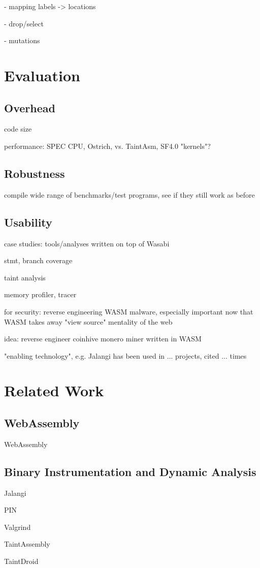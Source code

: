 \documentclass[sigplan,review,anonymous]{acmart}\settopmatter{printfolios=true,printccs=false,printacmref=false}
\newcommand{\name}{Wasabi}
\begin{document}
- mapping labels -> locations

- drop/select

- mutations

\newpage
\section{Evaluation}

\subsection{Overhead}
code size

performance: SPEC CPU, Ostrich, vs. TaintAsm, SF4.0 "kernels"?

\subsection{Robustness}
compile wide range of benchmarks/test programs, see if they still work as before

\subsection{Usability}
case studies: tools/analyses written on top of \name

stmt, branch coverage

taint analysis

memory profiler, tracer

for security: reverse engineering WASM malware, especially important now that WASM takes away "view source" mentality of the web

idea: reverse engineer coinhive monero miner written in WASM

"enabling technology", e.g. Jalangi has been used in ... projects, cited ... times

\newpage
\section{Related Work}

\subsection{WebAssembly}

WebAssembly \cite{Haas:2017:BWU:3062341.3062363}

\subsection{Binary Instrumentation and Dynamic Analysis}

Jalangi \cite{Sen:2013:JSR:2491411.2491447}

PIN \cite{Luk:2005:PBC:1065010.1065034}

Valgrind \cite{Nethercote:2007:VFH:1250734.1250746}

TaintAssembly \cite{2018arXiv180201050F}

TaintDroid \cite{Enck:2014:TIT:2642648.2619091}


\end{document}
